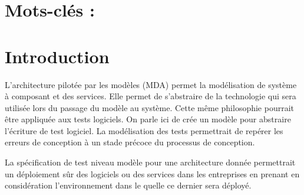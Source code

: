\documentclass[
10pt, %
a4paper, %
oneside, %
headinclude,footinclude, %
BCOR5mm, %
]{scrartcl}
\begin{document}
\lipsum[1] %


\section*{Mots-clés : }





\newpage %


\section{Introduction}

L’architecture pilotée par les modèles (MDA) permet la modélisation de système à composant et des services. Elle permet de s’abstraire de la technologie qui sera utilisée lors du passage du modèle au système. Cette même philosophie pourrait être appliquée aux tests logiciels. On parle ici de crée un modèle pour abstraire l’écriture de test logiciel. La modélisation des tests permettrait de repérer les erreurs de conception à un stade précoce du processus de conception.

La spécification de test niveau modèle pour une architecture donnée permettrait un déploiement sûr des logiciels ou des services dans les entreprises en prenant en considération l'environnement dans le quelle ce dernier sera déployé. \citep{Figueredo}
 
\end{document}
